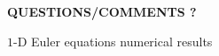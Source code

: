 \documentclass[xcolor=dvipsnames,10pt]{beamer}
\begin{document}
\begin{frame}{}
\begin{center}
\LARGE{\textbf{QUESTIONS/COMMENTS ?}}
\end{center}
\end{frame}
\begin{frame}{}
\begin{center}
$1$-D Euler equations numerical results
\end{center}
\end{frame}
\end{document}
